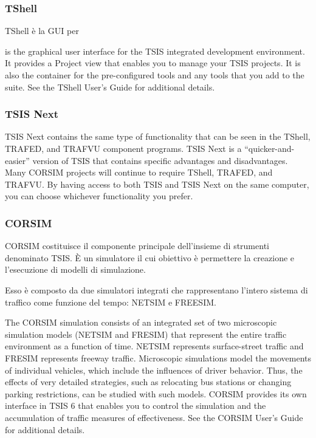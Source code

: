 \subsubsection{TShell}

TShell è la \acs{GUI} per 

is the graphical user interface for the TSIS integrated development environment. It provides a Project view
that enables you to manage your TSIS projects. It is also the container for the pre-configured tools and any tools
that you add to the suite. See the TShell User's Guide for additional details.

\subsubsection{TSIS Next}

TSIS Next contains the same type of functionality that can be seen in the TShell, TRAFED, and TRAFVU
component programs. TSIS Next is a “quicker-and-easier” version of TSIS that contains specific advantages and
disadvantages. Many CORSIM projects will continue to require TShell, TRAFED, and TRAFVU. By having
access to both TSIS and TSIS Next on the same computer, you can choose whichever functionality you prefer.

\subsubsection{CORSIM}

\acf{CORSIM} costituisce il componente principale dell'insieme di strumenti denominato \acs{TSIS}. È un simulatore il cui obiettivo è permettere la creazione e l'esecuzione di modelli di simulazione. 

Esso è composto da due simulatori integrati che rappresentano l'intero sistema di traffico come funzione del tempo: \acf{NETSIM} e \acf{FREESIM}.

The CORSIM simulation consists of an integrated set of two microscopic simulation models (NETSIM and
FRESIM) that represent the entire traffic environment as a function of time. NETSIM represents surface-street
traffic and FRESIM represents freeway traffic. Microscopic simulations model the movements of individual
vehicles, which include the influences of driver behavior. Thus, the effects of very detailed strategies, such as
relocating bus stations or changing parking restrictions, can be studied with such models. CORSIM provides its
own interface in TSIS 6 that enables you to control the simulation and the accumulation of traffic measures of
effectiveness. See the CORSIM User's Guide for additional details.

